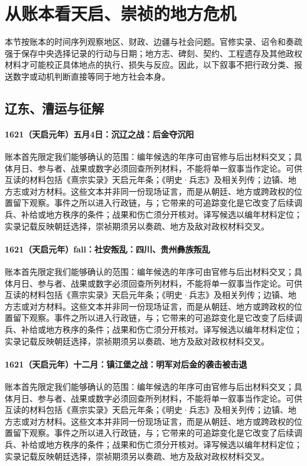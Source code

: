 \section{从账本看天启、崇祯的地方危机}

本节按账本的时间序列观察地区、财政、边疆与社会问题。官修实录、诏令和奏疏强于保存中央选择记录的行动与日期；地方志、碑刻、契约、工程遗存及其他政权材料才可能校正具体地点的执行、损失与反应。因此，以下叙事不把行政分类、报送数字或动机判断直接等同于地方社会本身。

\subsection{辽东、漕运与征解}

\paragraph{1621（天启元年）五月4日：沉辽之战：后金夺沉阳} 账本首先限定我们能够确认的范围：编年候选的年序可由官修与后出材料交叉；具体月日、参与者、战果或数字必须回查所列材料，不能将单一叙事当作定论。可供互读的材料包括《熹宗实录》天启元年条；《明史·兵志》及相关列传；边镇、地方志或对方材料。这些文本并非同一份现场证言，而是从朝廷、地方或跨政权的位置留下观察。事件之所以进入行政链，与；它带来的可追踪变化是它改变了后续调兵、补给或地方秩序的条件；战果和伤亡须分开核对。译写候选以编年材料定位；实录记载反映朝廷选择，崇祯期须另以奏疏、地方及敌对政权材料交叉。

\paragraph{1621（天启元年）fall：社安叛乱：四川、贵州彝族叛乱} 账本首先限定我们能够确认的范围：编年候选的年序可由官修与后出材料交叉；具体月日、参与者、战果或数字必须回查所列材料，不能将单一叙事当作定论。可供互读的材料包括《熹宗实录》天启元年条；《明史·兵志》及相关列传；边镇、地方志或对方材料。这些文本并非同一份现场证言，而是从朝廷、地方或跨政权的位置留下观察。事件之所以进入行政链，与；它带来的可追踪变化是它改变了后续调兵、补给或地方秩序的条件；战果和伤亡须分开核对。译写候选以编年材料定位；实录记载反映朝廷选择，崇祯期须另以奏疏、地方及敌对政权材料交叉。

\paragraph{1621（天启元年）十二月：镇江堡之战：明军对后金的袭击被击退} 账本首先限定我们能够确认的范围：编年候选的年序可由官修与后出材料交叉；具体月日、参与者、战果或数字必须回查所列材料，不能将单一叙事当作定论。可供互读的材料包括《熹宗实录》天启元年条；《明史·兵志》及相关列传；边镇、地方志或对方材料。这些文本并非同一份现场证言，而是从朝廷、地方或跨政权的位置留下观察。事件之所以进入行政链，与；它带来的可追踪变化是它改变了后续调兵、补给或地方秩序的条件；战果和伤亡须分开核对。译写候选以编年材料定位；实录记载反映朝廷选择，崇祯期须另以奏疏、地方及敌对政权材料交叉。

